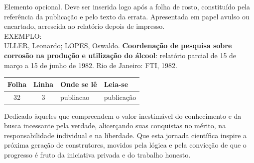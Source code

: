 \documentclass{Arquivos/TrabalhoAcademico}
\begin{document}
\nocite{*}


\pretextual %


\folhaderosto
\contracapa


\fichaCatalografica



\begin{errata}
\noindent Elemento opcional. Deve ser inserida logo após a folha de rosto, constituído pela referência da publicação e pelo texto da errata. Apresentada em papel avulso ou encartado, acrescida ao relatório depois de impresso.\\[1em]

\noindent EXEMPLO:\\[1em]

\noindent ULLER, Leonardo; LOPES, Oswaldo. \textbf{Coordenação de pesquisa sobre corrosão na produção e utilização do álcool}: relatório parcial de 15 de março a 15 de junho de 1982. Rio de Janeiro: FTI, 1982.\\[1em]

\renewcommand{\arraystretch}{1.5}
\begin{center}
    \begin{tabular}{|c|c|l|l|}
        \hline
        Folha & Linha & Onde se lê & Leia-se \\
        \hline
        32 & 3 & publiacao & publicação \\
        \hline
    \end{tabular}
\end{center}
\end{errata}



\folhadeaprovacao







\begin{dedicatoria}
    Dedicado àqueles que compreendem o valor
    inestimável do conhecimento e da busca incessante
    pela verdade, alicerçando suas conquistas no mérito,
    na responsabilidade individual e na liberdade.
    Que esta jornada científica inspire a próxima
    geração de construtores, movidos pela lógica
    e pela convicção de que o progresso é fruto
    da iniciativa privada e do trabalho honesto.
\end{dedicatoria}
\end{document}
